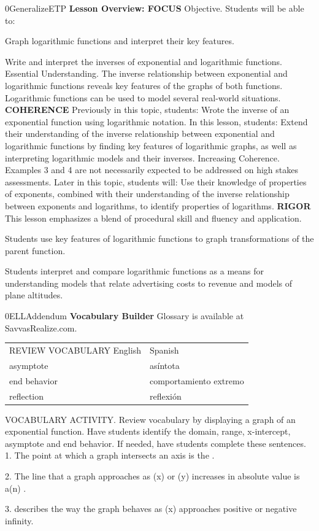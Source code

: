 \documentclass{article}
\newenvironment{te-addendum}[2]{}{}     %
\newcommand{\answer}[1]{}               %
\begin{document}
\begin{te-addendum}{0}{GeneralizeETP}
\textbf{Lesson Overview: FOCUS}
Objective. Students will be able to:
\item Graph logarithmic functions and interpret their key features.
\item Write and interpret the inverses of exponential and logarithmic functions.
Essential Understanding. The inverse relationship between exponential and logarithmic functions reveals key features of the graphs of both functions. Logarithmic functions can be used to model several real-world situations.
\textbf{COHERENCE}
Previously in this topic, students: Wrote the inverse of an exponential function using logarithmic notation.
In this lesson, students: Extend their understanding of the inverse relationship between exponential and logarithmic functions by finding key features of logarithmic graphs, as well as interpreting logarithmic models and their inverses.
Increasing Coherence. Examples 3 and 4 are not necessarily expected to be addressed on high stakes assessments.
Later in this topic, students will: Use their knowledge of properties of exponents, combined with their understanding of the inverse relationship between exponents and logarithms, to identify properties of logarithms.
\textbf{RIGOR}
This lesson emphasizes a blend of procedural skill and fluency and application.
\item Students use key features of logarithmic functions to graph transformations of the parent function.
\item Students interpret and compare logarithmic functions as a means for understanding models that relate advertising costs to revenue and models of plane altitudes.
\end{te-addendum}
\begin{te-addendum}{0}{ELLAddendum}
\textbf{Vocabulary Builder}
Glossary is available at SavvasRealize.com.
\begin{tabular}{ll}
REVIEW VOCABULARY English & Spanish \\
asymptote & asíntota \\
end behavior & comportamiento extremo \\
reflection & reflexión \\
\end{tabular}
VOCABULARY ACTIVITY. Review vocabulary by displaying a graph of an exponential function. Have students identify the domain, range, x-intercept, asymptote and end behavior. If needed, have students complete these sentences.
1. The point at which a graph intersects an axis is the \underline{\hspace{1cm}}.
\answer{intercept}
2. The line that a graph approaches as (x) or (y) increases in absolute value is a(n) \underline{\hspace{1cm}}.
\answer{asymptote}
3. \underline{\hspace{1cm}} describes the way the graph behaves as (x) approaches positive or negative infinity.
\answer{end behavior}
\end{te-addendum}
\end{document}
